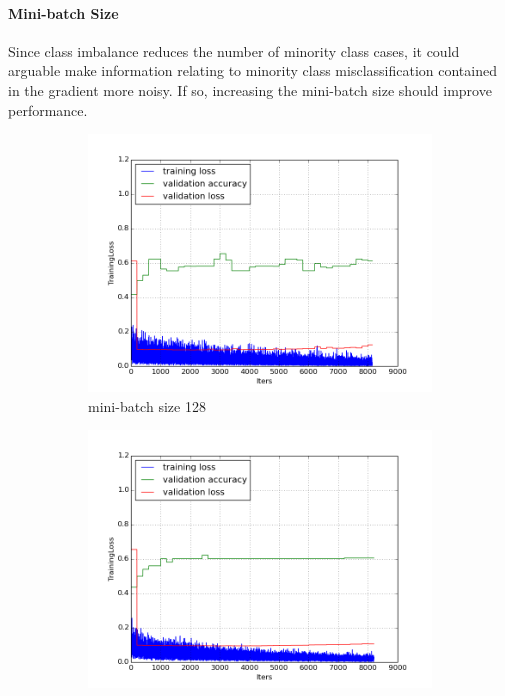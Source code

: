 \documentclass[a4paper,11pt]{article}
\begin{document}
\paragraph{Mini-batch Size}

Since class imbalance reduces the number of minority class cases, it could arguable make information relating to minority class misclassification contained in the gradient more noisy. If so, increasing the mini-batch size should improve performance.

\begin{figure}
    \centering
    \begin{minipage}[b]{\textwidth}
      \begin{subfigure}{.5\textwidth} 
        \centering
        \includegraphics[scale=0.4]{images/plot_clampdetCI98_none_bs128_lr4.png}
        \caption{mini-batch size 128}\label{fig:2a}
      \end{subfigure}%
      \begin{subfigure}{.5\textwidth} 
        \centering
        \includegraphics[scale=0.4]{images/plot_clampdetCI98_none_bs256_lr4.png}

\end{subfigure}
\end{minipage}
\end{figure}
\end{document}

